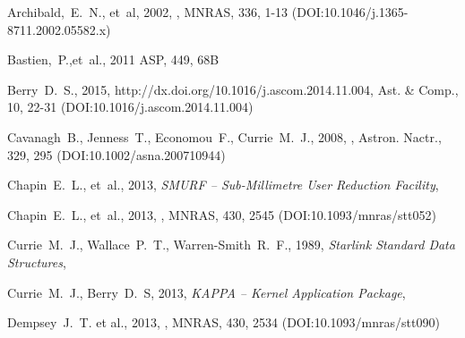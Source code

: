 \documentclass[11pt,oneside,chapters]{starlink}
\begin{document}
\newpage

\newpage

\newpage

\newpage

\newpage



\begin{thebibliography}{}



Archibald,~E.~N., et~al, 2002, , MNRAS, 336, 1-13
(DOI:10.1046/j.1365-8711.2002.05582.x)

Bastien,~P.,et~al., 2011   ASP, 449, 68B 

Berry~D.~S.,  2015,
{http://dx.doi.org/10.1016/j.ascom.2014.11.004},
Ast. \& Comp., 10, 22-31 (DOI:10.1016/j.ascom.2014.11.004)

Cavanagh~B., Jenness~T., Economou~F., Currie~M.~J., 2008,
, Astron. Nactr., 329, 295
(DOI:10.1002/asna.200710944)

Chapin~E.~L., et~al., 2013, \textit{SMURF -- Sub-Millimetre User Reduction
Facility}, 

Chapin~E.~L., et~al., 2013,
,
MNRAS, 430, 2545 (DOI:10.1093/mnras/stt052)

Currie~M.~J., Wallace~P.~T., Warren-Smith~R.~F., 1989,
\textit{Starlink Standard Data Structures}, 

Currie~M.~J., Berry~D.~S, 2013, \textit{KAPPA -- Kernel Application Package},

Dempsey~J.~T. et al., 2013, ,
MNRAS, 430, 2534 (DOI:10.1093/mnras/stt090)


\end{thebibliography}
\end{document}
